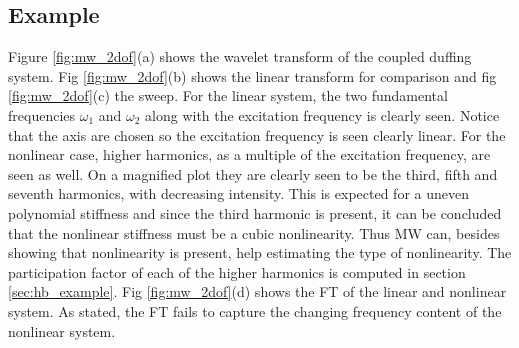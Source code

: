 \subsection{Example}
\label{sec:wt_example}


Figure \ref{fig:mw_2dof}(a) shows the wavelet transform of the coupled duffing
system. Fig \ref{fig:mw_2dof}(b) shows the linear transform for comparison and
fig \ref{fig:mw_2dof}(c) the sweep. For the linear system, the two fundamental
frequencies $\omega_1$ and $\omega_2$ along with the excitation frequency is
clearly seen. Notice that the axis are chosen so the excitation frequency is
seen clearly linear.
For the nonlinear case, higher harmonics, as a multiple of the excitation
frequency, are seen as well. On a magnified plot they are clearly seen to be the
third, fifth and seventh harmonics, with decreasing intensity. This is expected
for a uneven polynomial stiffness and since the third harmonic is present, it
can be concluded that the nonlinear stiffness must be a cubic nonlinearity. Thus
MW can, besides showing that nonlinearity is present, help estimating the type
of nonlinearity. The participation factor of each of the higher harmonics is
computed in section \ref{sec:hb_example}. Fig \ref{fig:mw_2dof}(d) shows the FT
of the linear and nonlinear system. As stated, the FT fails to capture the
changing frequency content of the nonlinear system.


